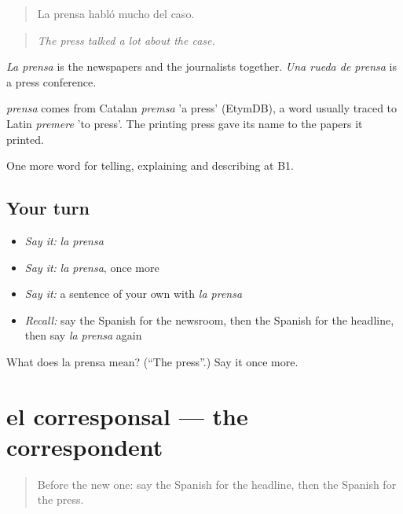 \begin{quote}
La prensa habló mucho del caso.
\end{quote}

\begin{quote}
\emph{The press talked a lot about the case.}
\end{quote}

\emph{La prensa} is the newspapers and the journalists together. \emph{Una rueda de prensa} is a press conference.

\begin{cousinweb}
\emph{prensa} comes from Catalan \emph{premsa} 'a press' (EtymDB), a word usually traced to Latin \emph{premere} 'to press'. The printing press gave its name to the papers it printed.
\end{cousinweb}

\begin{grammarlens}[title={What you've built}]
One more word for telling, explaining and describing at B1.
\end{grammarlens}

\subsection*{Your turn}
\begin{itemize}
\raggedright
  \item \emph{Say it:} \emph{la prensa}
  \item \emph{Say it:} \emph{la prensa}, once more
  \item \emph{Say it:} a sentence of your own with \emph{la prensa}
  \item \emph{Recall:} say the Spanish for the newsroom, then the Spanish for the headline, then say \emph{la prensa} again
\end{itemize}

\begin{tcolorbox}[breakable,colback=teal!4,colframe=teal!35!black,title={Before you move on}]
What does la prensa mean? (\textquotedblleft{}The press\textquotedblright{}.) Say it once more.
\end{tcolorbox}
\section[el corresponsal]{el corresponsal — the correspondent}

\label{lesson:ES-C513-corresponsal}



\begin{quote}
Before the new one: say the Spanish for the headline, then the Spanish for the press.
\end{quote}

